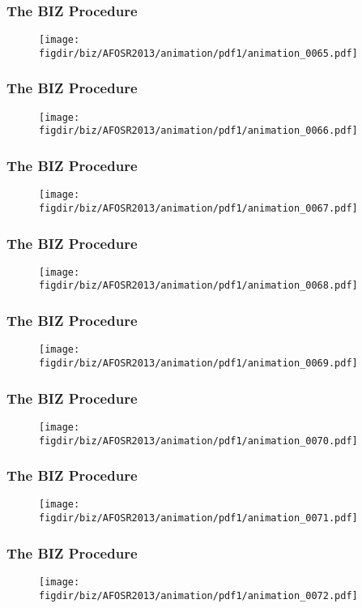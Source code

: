 \documentclass[13pt]{beamer}
\newcommand{\figdir}{../../fig}
\begin{document}
{\begin{frame}\frametitle{The BIZ Procedure}\begin{figure}\texttt{[image: \\figdir/biz/AFOSR2013/animation/pdf1/animation\_0065.pdf]}\end{figure}\end{frame}
\begin{frame}\frametitle{The BIZ Procedure}\begin{figure}\texttt{[image: \\figdir/biz/AFOSR2013/animation/pdf1/animation\_0066.pdf]}\end{figure}\end{frame}
\begin{frame}\frametitle{The BIZ Procedure}\begin{figure}\texttt{[image: \\figdir/biz/AFOSR2013/animation/pdf1/animation\_0067.pdf]}\end{figure}\end{frame}
\begin{frame}\frametitle{The BIZ Procedure}\begin{figure}\texttt{[image: \\figdir/biz/AFOSR2013/animation/pdf1/animation\_0068.pdf]}\end{figure}\end{frame}
\begin{frame}\frametitle{The BIZ Procedure}\begin{figure}\texttt{[image: \\figdir/biz/AFOSR2013/animation/pdf1/animation\_0069.pdf]}\end{figure}\end{frame}
\begin{frame}\frametitle{The BIZ Procedure}\begin{figure}\texttt{[image: \\figdir/biz/AFOSR2013/animation/pdf1/animation\_0070.pdf]}\end{figure}\end{frame}
\begin{frame}\frametitle{The BIZ Procedure}\begin{figure}\texttt{[image: \\figdir/biz/AFOSR2013/animation/pdf1/animation\_0071.pdf]}\end{figure}\end{frame}
\begin{frame}\frametitle{The BIZ Procedure}\begin{figure}\texttt{[image: \\figdir/biz/AFOSR2013/animation/pdf1/animation\_0072.pdf]}\end{figure}\end{frame}
}
\end{document}

